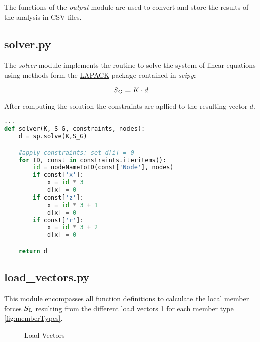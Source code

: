 The functions of the \textit{output} module are used to convert and store the results of the analysis in CSV files.

\subsection{solver.py}
\label{subsec:solver.py}

The \textit{solver} module implements the routine to solve the system of linear equations using methods form the \href{http://www.netlib.org/lapack/}{LAPACK} package contained in \textit{scipy}:

\begin{equation}
S\textsubscript{G} = K \cdot d
\end{equation}

After computing the solution the constraints are apllied to the resulting vector $d$.

\begin{inconsolata}
\begin{lstlisting}[language=python]
...
def solver(K, S_G, constraints, nodes):
    d = sp.solve(K,S_G)

    #apply constraints: set d[i] = 0
    for ID, const in constraints.iteritems():
        id = nodeNameToID(const['Node'], nodes)
        if const['x']:
            x = id * 3
            d[x] = 0
        if const['z']:
            x = id * 3 + 1
            d[x] = 0
        if const['r']:
            x = id * 3 + 2
            d[x] = 0

    return d
\end{lstlisting}
\end{inconsolata}

\subsection{load\_vectors.py}
\label{subsec:loadvectors.py}

This module encompasses all function definitions to calculate the local member forces $S\textsubscript{L}$  resulting from the different load vectors \ref{fig:loadVec} for each member type \ref{fig:memberTypes}.


\begin{figure}[h]%
    \centering
    \qquad

    \centering
    
    \caption{Load Vectors}%
    \label{fig:loadVec}%
\end{figure}


